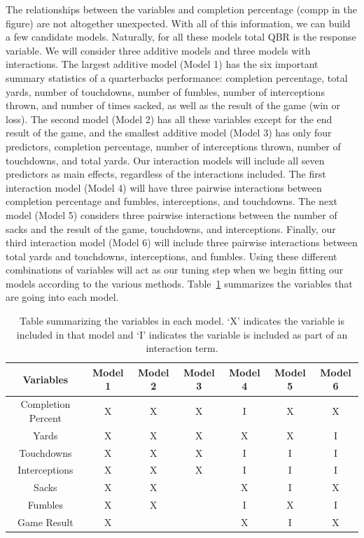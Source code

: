 \documentclass[12pt]{article}\usepackage[]{graphicx}\usepackage[]{color}
\begin{document}
The relationships between the variables and completion percentage (compp in the figure) are not altogether unexpected. With all of this information, we can build a few candidate models. Naturally, for all these models total QBR is the response variable. We will consider three additive models and three models with interactions. The largest additive model (Model 1) has the six important summary statistics of a quarterbacks performance: completion percentage, total yards, number of touchdowns, number of fumbles, number of interceptions thrown, and number of times sacked, as well as the result of the game (win or loss). The second model (Model 2) has all these variables except for the end result of the game, and the smallest additive model (Model 3) has only four predictors, completion percentage, number of interceptions thrown, number of touchdowns, and total yards. Our interaction models will include all seven predictors as main effects, regardless of the interactions included. The first interaction model (Model 4) will have three pairwise interactions between completion percentage and fumbles, interceptions, and touchdowns. The next model (Model 5) considers three pairwise interactions between the number of sacks and the result of the game, touchdowns, and interceptions. Finally, our third interaction model (Model 6) will include three pairwise interactions between total yards and touchdowns, interceptions, and fumbles. Using these different combinations of variables will act as our tuning step when we begin fitting our models according to the various methods. Table~\ref{tab:models} summarizes the variables that are going into each model.

\begin{table}[h]
\centering
\begin{tabular}{|c|c|c|c|c|c|c|}
\hline
Variables & Model 1 & Model 2 & Model 3 & Model 4 & Model 5 & Model 6\\
\hline
Completion Percent & X & X & X & I & X & X \\
\hline
Yards & X & X & X & X & X & I \\
\hline
Touchdowns & X & X & X & I & I & I \\
\hline
Interceptions & X & X & X & I & I & I \\
\hline
Sacks & X & X &  & X & I & X \\
\hline
Fumbles & X & X &  & I & X & I \\
\hline
Game Result & X & & & X & I & X\\
\hline
\end{tabular}
\captionsetup{font=footnotesize,labelfont=footnotesize}
\caption{\label{tab:models} Table summarizing the variables in each model. `X' indicates the variable is included in that model and `I' indicates the variable is included as part of an interaction term.}
\end{table}
\end{document}

